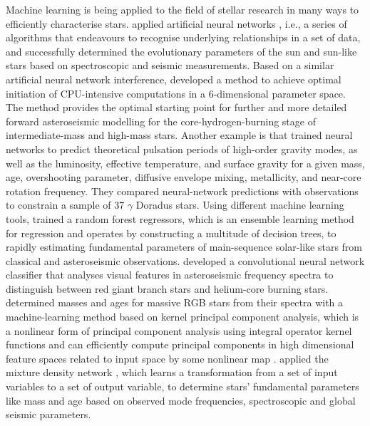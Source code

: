 Machine learning is being applied to the field of stellar research in many ways to efficiently characterise stars.
\citet{2016MNRAS.461.4206V} applied artificial neural networks \citep{bain1873mind,james1890principles}, i.e., a series of algorithms that endeavours to recognise underlying relationships in a set of data, and successfully determined the evolutionary parameters of the sun and sun-like stars based on spectroscopic and seismic measurements. Based on a similar artificial neural network interference, \citet{2019PASP..131j8001H} developed a method to achieve optimal initiation of CPU-intensive computations in a 6-dimensional parameter space. The method provides the optimal starting point for further and more detailed forward asteroseismic modelling for the core-hydrogen-burning stage of intermediate-mass and high-mass stars. Another example is that \citet{2021arXiv210313394M} trained neural networks to predict theoretical pulsation periods of high-order gravity modes, as well as the luminosity, effective temperature, and surface gravity for a given mass, age, overshooting parameter, diffusive envelope mixing, metallicity, and near-core rotation frequency. They compared neural-network predictions with observations to constrain a sample of 37 $\gamma$ Doradus stars.
%
Using different machine learning tools, \citet{2016ApJ...830...31B} trained a random forest regressors\citep{ho1995random}, which is an ensemble learning method for regression and operates by constructing a multitude of decision trees, to  rapidly estimating fundamental parameters of main-sequence solar-like stars from classical and asteroseismic observations. \citet{2018MNRAS.476.3233H} developed a convolutional neural network classifier that analyses visual features in asteroseismic frequency spectra to distinguish between red giant branch stars and helium-core burning stars. \citet{2019MNRAS.484.5315W} determined masses and ages for massive RGB stars from their spectra with a machine-learning method based on kernel principal component analysis, which is a nonlinear form of principal component analysis using integral operator kernel functions and can efficiently compute principal components in high dimensional feature spaces related to input space by some nonlinear map \citep{scholkopf1997kernel}. \citet{2020MNRAS.499.2445H} applied the mixture density network \citep{bishop1994mixture}, which learns a transformation from a set of input variables to a set of output variable, to determine stars' fundamental parameters like mass and age based on observed mode frequencies, spectroscopic and global seismic parameters.
